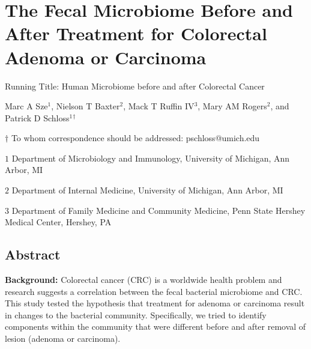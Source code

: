 \documentclass[12pt,]{article}
\title{}
\author{}
\date{}
\begin{document}
\section{The Fecal Microbiome Before and After Treatment for Colorectal
Adenoma or
Carcinoma}\label{the-fecal-microbiome-before-and-after-treatment-for-colorectal-adenoma-or-carcinoma}

\vspace{25mm}

\begin{center}
Running Title: Human Microbiome before and after Colorectal Cancer

\vspace{10mm}

Marc A Sze${^1}$, Nielson T Baxter${^2}$, Mack T Ruffin IV${^3}$, Mary AM Rogers${^2}$, and Patrick D Schloss${^1}$${^\dagger}$

\vspace{20mm}

$\dagger$ To whom correspondence should be addressed: pschloss@umich.edu

$1$ Department of Microbiology and Immunology, University of Michigan, Ann Arbor, MI

$2$ Department of Internal Medicine, University of Michigan, Ann Arbor, MI   

$3$ Department of Family Medicine and Community Medicine, Penn State Hershey Medical Center, Hershey, PA    


\end{center}

\newpage

\linenumbers

\subsection{Abstract}\label{abstract}

\textbf{Background:} Colorectal cancer (CRC) is a worldwide health
problem and research suggests a correlation between the fecal bacterial
microbiome and CRC. This study tested the hypothesis that treatment for
adenoma or carcinoma result in changes to the bacterial community.
Specifically, we tried to identify components within the community that
were different before and after removal of lesion (adenoma or
carcinoma).
\end{document}
